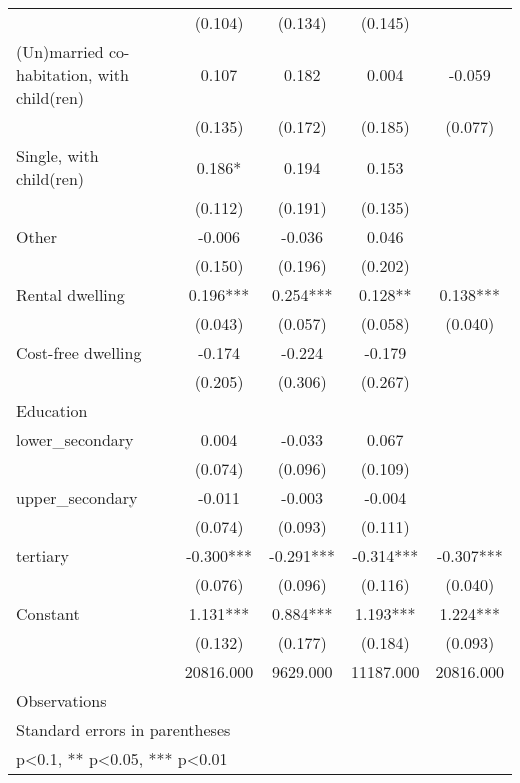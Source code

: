 \begin{table}[htbp]
\begin{tabular}{l*{4}{c}}
                &  (0.104)   &  (0.134)   &  (0.145)   &            \\
(Un)married co-habitation, with child(ren)&    0.107   &    0.182   &    0.004   &   -0.059   \\
                &  (0.135)   &  (0.172)   &  (0.185)   &  (0.077)   \\
Single, with child(ren)&    0.186*  &    0.194   &    0.153   &            \\
                &  (0.112)   &  (0.191)   &  (0.135)   &            \\
Other           &   -0.006   &   -0.036   &    0.046   &            \\
                &  (0.150)   &  (0.196)   &  (0.202)   &            \\
Rental dwelling &    0.196***&    0.254***&    0.128** &    0.138***\\
                &  (0.043)   &  (0.057)   &  (0.058)   &  (0.040)   \\
Cost-free dwelling&   -0.174   &   -0.224   &   -0.179   &            \\
                &  (0.205)   &  (0.306)   &  (0.267)   &            \\
Education       &            &            &            &            \\
lower\_secondary &    0.004   &   -0.033   &    0.067   &            \\
                &  (0.074)   &  (0.096)   &  (0.109)   &            \\
upper\_secondary &   -0.011   &   -0.003   &   -0.004   &            \\
                &  (0.074)   &  (0.093)   &  (0.111)   &            \\
tertiary        &   -0.300***&   -0.291***&   -0.314***&   -0.307***\\
                &  (0.076)   &  (0.096)   &  (0.116)   &  (0.040)   \\
Constant        &    1.131***&    0.884***&    1.193***&    1.224***\\
                &  (0.132)   &  (0.177)   &  (0.184)   &  (0.093)   \\
\midrule
\hspace{2mm}    &20816.000   & 9629.000   &11187.000   &20816.000   \\
Observations    &            &            &            &            \\
\bottomrule
\multicolumn{5}{l}{\footnotesize Standard errors in parentheses}\\
\multicolumn{5}{l}{\footnotesize * p<0.1, ** p<0.05, *** p<0.01}\\
\end{tabular}
\end{table}
